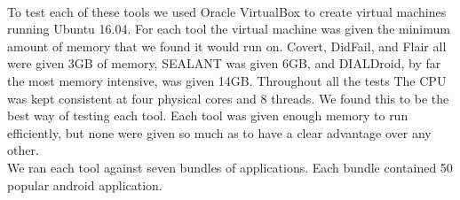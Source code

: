 \documentclass[twocolumn]{article}
\begin{document}
\paragraph*{}
	To test each of these tools we used Oracle VirtualBox to create virtual machines running Ubuntu 16.04. For each tool the virtual machine was given the minimum amount of memory that we found it would run on. Covert, DidFail, and Flair all were given 3GB of memory, SEALANT was given 6GB, and DIALDroid, by far the most memory intensive, was given 14GB. Throughout all the tests The CPU was kept consistent at four physical cores and 8 threads. We found this to be the best way of testing each tool. Each tool was given enough memory to run efficiently, but none were given so much as to have a clear advantage over any other.\\ 
	We ran each tool against seven bundles of applications. Each bundle contained 50 popular android application.
\end{document}
